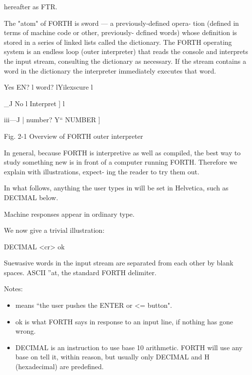 hereafter as FTR.



The "atom" of FORTH is sword — a previously-deﬁned opera-
tion (deﬁned in terms of machine code or other, previously-
dcﬁned words) whose definition is stored in a series of linked lists
called the dictionary. The FORTH operating system is an endless
loop (outer interpreter) that reads the console and interprets the
input stream, consulting the dictionary as necessary. If the stream
contains a word in the dictionary the interpreter immediately
executes that word.

Yes
EN? l word? lYilexscure l

_J
No l Interpret ] l

iii—J | number? Y“ NUMBER ]

 

 

 

 

 

 

 

 

 

 

Fig. 2-1 Overview of FORTH outer interpreter



In general, because FORTH is interpretive as well as compiled,
the best way to study something new is in front of a computer
running FORTH. Therefore we explain with illustrations, expect-
ing the reader to try them out.



In what follows, anything the user types in will be set in Helvetica,
such as DECIMAL below.



Machine responses appear in ordinary type.


We now give a trivial illustration:


DECIMAL <cr> ok





Suewasive words in the input stream are separated from each other by blank spaces. ASCII
”at, the standard FORTH delimiter.



Notes:
\begin{itemize}
  \item < cr > means “the user pushes the ENTER or <= button".


  \item ok is what FORTH says in response to an input line, if nothing
has gone wrong.
  \item DECIMAL is an instruction to use base 10 arithmetic. FORTH
will use any base on tell it, within reason, but usually only
DECIMAL and H (hexadecimal) are predeﬁned.
\end{itemize}



